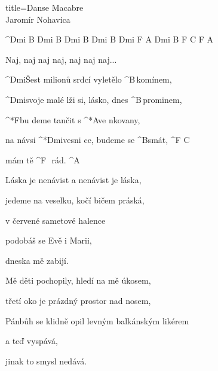\begin{song}{title=\predtitle\centering Danse Macabre \\\large Jaromír Nohavica \vspace*{-0.3cm}}  %
\begin{centerjustified}
\nejnejvetsi

^{Dmi B Dmi B Dmi B Dmi B Dmi F A Dmi B F C F A}\begin{flushleft}Naj, naj naj naj, naj naj naj\elipsa.\elipsa.\elipsa.\end{flushleft}

\sloka
	^{Dmi}Šest milionů srdcí vyletělo ^{\z B\,}komínem,

	^{Dmi}svoje malé lži si, lásko, dnes ^{\z B\,}prominem,

	^*{F}bu deme tančit s ^*{A}ve nkovany,

	na návsi ^*{Dmi}vesni ce, budeme se ^{B\z }smát, ^{F\,\,C}

	mám tě ^{F\,\,\,\,}rád. ^{A}


\sloka
	Láska je nenávist a nenávist je láska,

	jedeme na veselku, kočí bičem práská,

	v červené sametové halence

	podobáš se Evě i Marii,

	dneska mě zabijí.


\sloka
	Mě děti pochopily, hledí na mě úkosem,

	třetí oko je prázdný prostor nad nosem,

	Pánbůh se klidně opil levným balkánským likérem

	a teď vyspává,

	jinak to smysl nedává.

\end{centerjustified}
\setcounter{Slokočet}{0}
\end{song}
